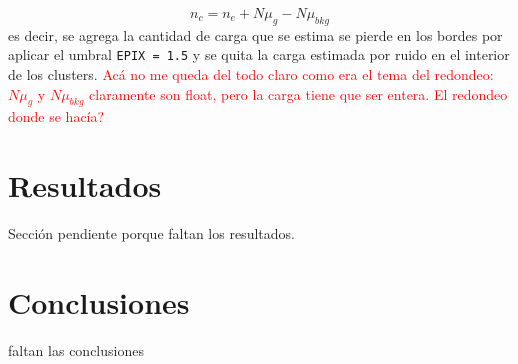 \begin{equation*}
    n_{c} = n_{e} + N\mu_{g} - N\mu_{bkg}
\end{equation*}
es decir, se agrega la cantidad de carga que se estima se pierde en los bordes por aplicar el umbral \verb|EPIX = 1.5| y se quita la carga estimada por ruido en el interior de los clusters. \textcolor{red}{Acá no me queda del todo claro como era el tema del redondeo: $N\mu_{g}$ y $N\mu_{bkg}$ claramente son float, pero la carga tiene que ser entera. El redondeo donde se hacía?}


\chapter{Resultados}
Sección pendiente porque faltan los resultados.


\chapter{Conclusiones}
faltan las conclusiones